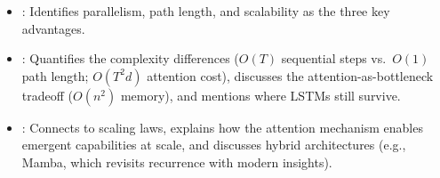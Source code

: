 \begin{interviewq}
\goodgreat
\begin{itemize}
\item {}: Identifies parallelism, path length, and
  scalability as the three key advantages.
\item {}: Quantifies the complexity differences ($O(T)$
  sequential steps vs.\ $O(1)$ path length; $O(T^2 d)$ attention cost),
  discusses the attention-as-bottleneck tradeoff ($O(n^2)$ memory), and
  mentions where LSTMs still survive.
\item {}: Connects to scaling laws, explains how the
  attention mechanism enables emergent capabilities at scale, and
  discusses hybrid architectures (e.g., Mamba, which revisits
  recurrence with modern insights).
\end{itemize}

\end{interviewq}

